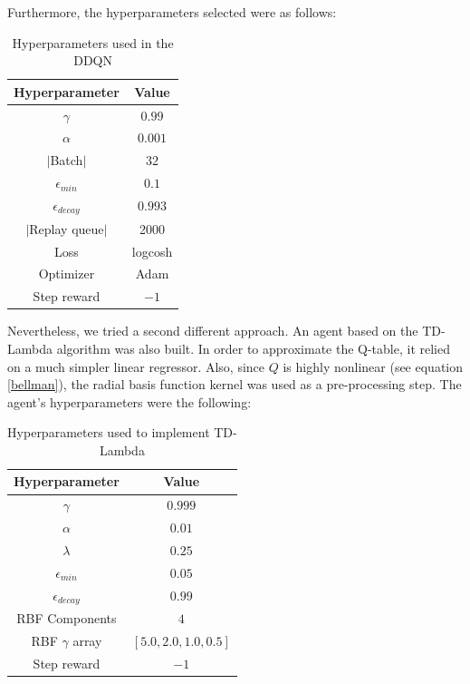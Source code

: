 \documentclass[11pt,twoside]{article}
\begin{document}
Furthermore, the hyperparameters selected were as follows:

\begin{table}[H]
	\begin{center}
		\begin{tabular}{|c |c|} 
			\hline
			Hyperparameter & Value \\
			\hline\hline
			$\gamma$ & $0.99$ \\
			$\alpha$ & $0.001$ \\
			$|$Batch$|$ & $32$ \\
			$\epsilon_{min}$ & $0.1$ \\
			$\epsilon_{decay}$ & $0.993$ \\
			$|$Replay queue$|$ & 2000 \\
			Loss & logcosh \\
			Optimizer & Adam \\
			Step reward & $-1$ \\
			\hline
		\end{tabular}
		\caption{Hyperparameters used in the DDQN}
	\end{center}
\end{table}

Nevertheless, we tried a second different approach. An agent based on the TD-Lambda algorithm was also built. In order to approximate the Q-table, it relied on a much simpler linear regressor. Also, since $Q$ is highly nonlinear (see equation \ref{bellman}), the radial basis function kernel was used as a pre-processing step. The agent's hyperparameters were the following:

\begin{table}[H]
	\begin{center}
		\begin{tabular}{|c |c|} 
			\hline
			Hyperparameter & Value \\
			\hline\hline
			$\gamma$ & $0.999$ \\
			$\alpha$ & $0.01$ \\
			$\lambda$ & $0.25$ \\
			$\epsilon_{min}$ & $0.05$ \\
			$\epsilon_{decay}$ & $0.99$ \\
			RBF Components & $4$ \\
			RBF $\gamma$ array & $[5.0, 2.0, 1.0, 0.5]$ \\
			Step reward & $-1$ \\
			\hline
		\end{tabular}
		\caption{Hyperparameters used to implement TD-Lambda}
	\end{center}
\end{table}
\end{document}
